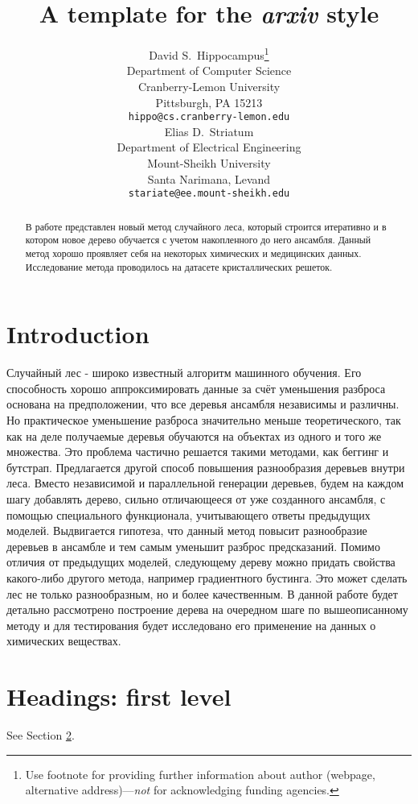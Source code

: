 \documentclass{article}
\title{A template for the \emph{arxiv} style}
\author{ David S.~Hippocampus\thanks{Use footnote for providing further
		information about author (webpage, alternative
		address)---\emph{not} for acknowledging funding agencies.} \\
	Department of Computer Science\\
	Cranberry-Lemon University\\
	Pittsburgh, PA 15213 \\
	\texttt{hippo@cs.cranberry-lemon.edu} \\
	\And
	Elias D.~Striatum \\
	Department of Electrical Engineering\\
	Mount-Sheikh University\\
	Santa Narimana, Levand \\
	\texttt{stariate@ee.mount-sheikh.edu} \\
}
\date{}
\begin{document}
\maketitle

\begin{abstract}
	В работе представлен новый метод случайного леса, который строится итеративно и в котором новое дерево обучается с учетом накопленного до него ансамбля. Данный метод хорошо проявляет себя на некоторых химических и медицинских данных. Исследование метода проводилось на датасете кристаллических решеток.
\end{abstract}



\section{Introduction}

Случайный лес - широко известный алгоритм машинного обучения.
Его способность хорошо аппроксимировать данные за счёт
уменьшения разброса основана на предположении, что все деревья
ансамбля независимы и различны. Но практическое уменьшение
разброса значительно меньше теоретического, так как на деле
получаемые деревья обучаются на объектах из одного и того же
множества. Это проблема частично решается такими методами, как
беггинг и бутстрап.
Предлагается другой способ повышения разнообразия деревьев
внутри леса. Вместо независимой и параллельной генерации деревьев,
будем на каждом шагу добавлять дерево, сильно отличающееся от уже
созданного ансамбля, с помощью специального функционала,
учитывающего ответы предыдущих моделей. Выдвигается гипотеза,
что данный метод повысит разнообразие деревьев в ансамбле и тем
самым уменьшит разброс предсказаний.
Помимо отличия от предыдущих моделей, следующему дереву можно
придать свойства какого-либо другого метода, например градиентного
бустинга. Это может сделать лес не только разнообразным, но и более
качественным.
В данной работе будет детально рассмотрено построение дерева на
очередном шаге по вышеописанному методу и для тестирования будет
исследовано его применение на данных о химических веществах.

\section{Headings: first level}
\label{sec:headings}

\lipsum[4] See Section \ref{sec:headings}.
\end{document}
